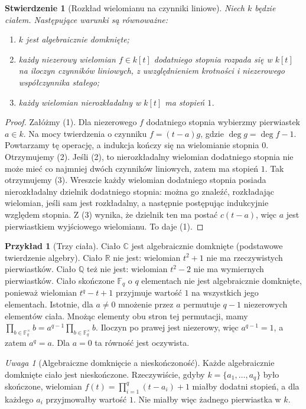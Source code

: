 \documentclass[11pt,a4paper,openany]{report}
\numberwithin{equation}{section}
\theoremstyle{plain}
\newtheorem{stwierdzenie}[twierdzenie]{Stwierdzenie}
\theoremstyle{definition}
\newtheorem{przyklad}[twierdzenie]{Przykład}
\theoremstyle{remark}
\newtheorem{uwaga}[twierdzenie]{Uwaga}
\newcommand{\Q}{\mathbb Q}
\newcommand{\R}{\mathbb R}
\newcommand{\C}{\mathbb C}
\newcommand{\F}{\mathbb F}
\begin{document}
\begin{stwierdzenie}[Rozkład wielomianu na czynniki liniowe]
Niech $k$ będzie ciałem. Następujące warunki są równoważne:
\begin{enumerate}[label=\arabic*)]
\item $k$ jest algebraicznie domknięte;
\item każdy niezerowy wielomian $f\in k[t]$ dodatniego stopnia
rozpada się w $k[t]$ na iloczyn czynników liniowych, z uwzględnieniem
krotności i niezerowego współczynnika stałego;
\item każdy wielomian nierozkładalny w $k[t]$ ma stopień $1$.
\end{enumerate}
\end{stwierdzenie}
\begin{proof}
Załóżmy (1). Dla niezerowego $f$ dodatniego stopnia wybierzmy
pierwiastek $a\in k$. Na mocy twierdzenia o czynniku
$f=(t-a)g$, gdzie $\deg g=\deg f-1$. Powtarzamy tę operację,
a indukcja kończy się na wielomianie stopnia $0$. Otrzymujemy (2).
Jeśli (2), to nierozkładalny wielomian dodatniego stopnia nie może
mieć co najmniej dwóch czynników liniowych, zatem ma stopień $1$.
Tak otrzymujemy (3). Wreszcie każdy wielomian dodatniego stopnia
posiada nierozkładalny dzielnik dodatniego stopnia:
można go znaleźć, rozkładając wielomian, jeśli sam jest rozkładalny,
a następnie postępując indukcyjnie względem stopnia.
Z (3) wynika, że dzielnik ten ma postać $c(t-a)$,
więc $a$ jest pierwiastkiem wyjściowego wielomianu. To daje (1).
\end{proof}

\begin{przyklad}[Trzy ciała]
Ciało $\C$ jest algebraicznie domknięte (podstawowe twierdzenie algebry).
Ciało $\R$ nie jest: wielomian $t^2+1$ nie ma rzeczywistych pierwiastków.
Ciało $\Q$ też nie jest: wielomian $t^2-2$ nie ma wymiernych
pierwiastków. Ciało skończone $\F_q$ o $q$ elementach nie jest algebraicznie
domknięte, ponieważ wielomian $t^q-t+1$ przyjmuje wartość $1$
na wszystkich jego elementach. Istotnie, dla $a\ne0$
mnożenie przez $a$ permutuje $q-1$ niezerowych elementów ciała.
Mnożąc elementy obu stron tej permutacji, mamy
$\prod_{b\in\F_q^\times}b
=a^{q-1}\prod_{b\in\F_q^\times}b$.
Iloczyn po prawej jest niezerowy, więc $a^{q-1}=1$,
a zatem $a^q=a$. Dla $a=0$ ta równość jest oczywista.
\end{przyklad}

\begin{uwaga}[Algebraiczne domknięcie a nieskończoność]
Każde algebraicznie domknięte ciało jest nieskończone.
Rzeczywiście, gdyby $k=\{a_1,\dots,a_q\}$ było skończone,
wielomian $f(t)=\prod_{i=1}^q(t-a_i)+1$ miałby dodatni stopień,
a dla każdego $a_i$ przyjmowałby wartość $1$.
Nie miałby więc żadnego pierwiastka w $k$.
\end{uwaga}
\end{document}
